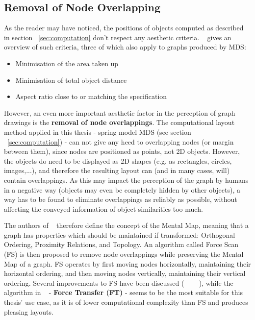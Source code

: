 \subsection{Removal of Node Overlapping}

As the reader may have noticed, the positions of objects computed as described in section ~\ref{sec:computation} don't respect any aesthetic criteria. ~\cite{Li:2005} gives an overview of such criteria, three of which also apply to graphs produced by MDS:

\begin{itemize}
	\item Minimisation of the area taken up
	\item Minimisation of total object distance
	\item Aspect ratio close to or matching the specification
\end{itemize}

However, an even more important aesthetic factor in the perception of graph drawings is the \textbf{removal of node overlappings}. The computational layout method applied in this thesis - spring model MDS (see section ~\ref{sec:computation}) - can not give any heed to overlapping nodes (or margin between them), since nodes are positioned as points, not 2D objects. However, the objects do need to be displayed as 2D shapes (e.g. as rectangles, circles, images,...), and therefore the resulting layout can (and in many cases, will) contain overlappings.
As this may impact the perception of the graph by humans in a negative way (objects may even be completely hidden by other objects), a way has to be found to eliminate overlappings as reliably as possible, without affecting the conveyed information of object similarities too much.

The authors of ~\cite{journals/vlc/MisueELS95} therefore define the concept of the Mental Map, meaning that a graph has properties which should be maintained if transformed: Orthogonal Ordering, Proximity Relations, and Topology. An algorithm called Force Scan (FS) is then proposed to remove node overlappings while preserving the Mental Map of a graph. FS operates by first moving nodes horizontally, maintaining their horizontal ordering, and then moving nodes vertically, maintaining their vertical ordering. Several improvements to FS have been discussed (~\cite{Hayashi:1998:LAP:647550.728930} ~\cite{Huang03force-transfer:a} ~\cite{Li:2005}), while the algorithm in ~\cite{Huang03force-transfer:a} - \textbf{Force Transfer (FT)} - seems to be the most suitable for this thesis' use case, as it is of lower computational complexity than FS and produces pleasing layouts.

